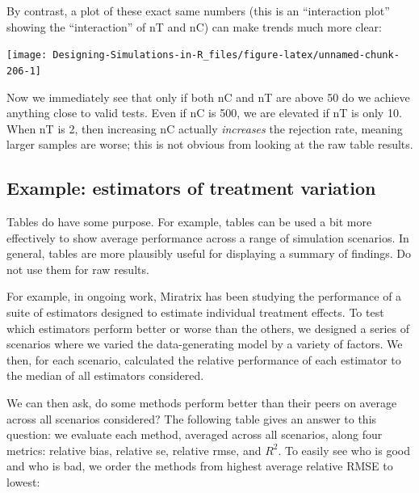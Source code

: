 \documentclass[
]{book}
\begin{document}
By contrast, a plot of these exact same numbers (this is an ``interaction plot'' showing the ``interaction'' of nT and nC) can make trends much more clear:

\begin{center}\texttt{[image: Designing-Simulations-in-R\_files/figure-latex/unnamed-chunk-206-1]} \end{center}

Now we immediately see that only if both nC and nT are above 50 do we achieve anything close to valid tests.
Even if nC is 500, we are elevated if nT is only 10. When nT is 2, then increasing nC actually \emph{increases} the rejection rate, meaning larger samples are worse; this is not obvious from looking at the raw table results.

\subsection{Example: estimators of treatment variation}\label{example-estimators-of-treatment-variation}

Tables do have some purpose.
For example, tables can be used a bit more effectively to show average performance across a range of simulation scenarios.
In general, tables are more plausibly useful for displaying a summary of findings. Do not use them for raw results.

For example, in ongoing work, Miratrix has been studying the performance of a suite of estimators designed to estimate individual treatment effects.
To test which estimators perform better or worse than the others, we designed a series of scenarios where we varied the data-generating model by a variety of factors.
We then, for each scenario, calculated the relative performance of each estimator to the median of all estimators considered.

We can then ask, do some methods perform better than their peers on average across all scenarios considered?
The following table gives an answer to this question: we evaluate each method, averaged across all scenarios, along four metrics: relative bias, relative se, relative rmse, and \(R^2\).
To easily see who is good and who is bad, we order the methods from highest average relative RMSE to lowest:
\end{document}
